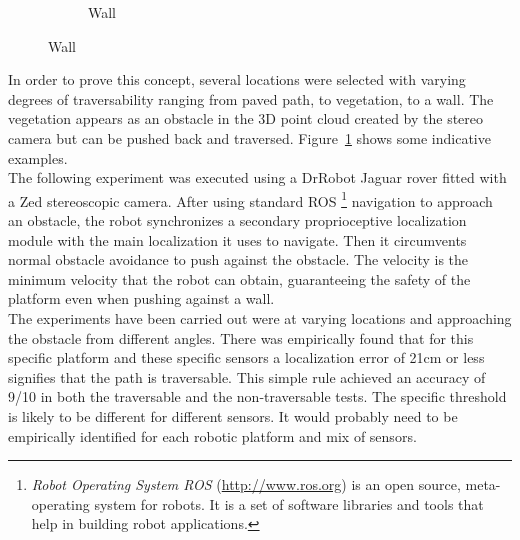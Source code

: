 \documentclass[12pt,a4paper,table,dvipsnames,tikz]{report}
\newcommand{\term}{\textit}
\newcommand{\acronym}{\MakeUppercase}
\newcommand{\bl}[1]{{\hypersetup{linkcolor=blue}#1}}
\begin{document}
\begin{figure}[h!]
\begin{subfigure}[b]{0.3\textwidth}
			\caption{Wall}
		\end{subfigure}
		\label{fig:scenes}
	\end{figure}
	
	In order to prove this concept, several locations were selected with varying degrees 
	of traversability ranging from paved path, to vegetation, to a wall. The vegetation 
	appears as an obstacle in the \acronym{3d} point cloud created by the stereo camera 
	but can be pushed back and traversed. Figure~\bl{\ref{fig:scenes}} shows some 
	indicative examples. 
	\\
	
	The following experiment was executed using a DrRobot Jaguar rover fitted with a 
	Zed stereoscopic camera. After using standard \acronym{ros} 
	\footnote{ \term{Robot Operating System \acronym{ros}} (\url{http://www.ros.org}) 
		is an open source, meta-operating system for robots. It is a set of software 
		libraries and tools that help in building robot applications.}
	navigation to approach an obstacle, the robot synchronizes 
	a secondary proprioceptive localization module with the main localization it uses
	to navigate. Then it circumvents normal obstacle avoidance to push against the 
	obstacle. The velocity is the minimum velocity that the robot can obtain, 
	guaranteeing the safety of the platform even when pushing against a wall.
	\\
	
	The experiments have been carried out were at varying locations and approaching the 
	obstacle from different angles. There was empirically found that for this specific 
	platform and these specific sensors a localization error of 21cm or less signifies 
	that the path is traversable. This simple rule achieved an accuracy of 9/10 in both 
	the traversable and the non-traversable tests. The specific threshold is likely 
	to be different for different sensors. It would probably need to be empirically 
	identified for each robotic platform and mix of sensors.
	\\
	
	
	
	\renewcommand{\bibname}{References}
	
	
\end{document}

